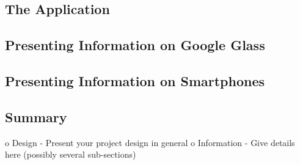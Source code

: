 

\subsection{The Application}
\label{subsec:application}

\subsection{Presenting Information on Google Glass}
\label{subsec:informationlimitedspace}
%

\subsection{Presenting Information on Smartphones}
\label{subsec:smartphones}
%

\subsection{Summary}
\label{subsec:summary}
%

o   Design - Present your project design in general
o   Information - Give details here (possibly several sub-sections)

